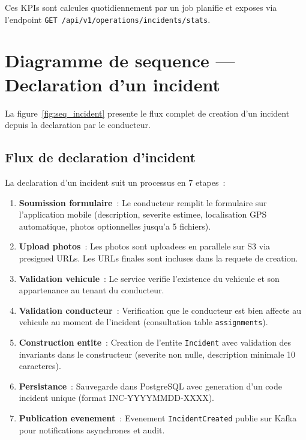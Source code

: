 \documentclass[12pt,a4paper]{report}
\begin{document}
Ces KPIs sont calcules quotidiennement par un job planifie et exposes
via l'endpoint \texttt{GET /api/v1/operations/incidents/stats}.

\section{Diagramme de sequence --- Declaration d'un incident}

La figure~\ref{fig:seq_incident} presente le flux complet de creation
d'un incident depuis la declaration par le conducteur.

\subsection{Flux de declaration d'incident}

La declaration d'un incident suit un processus en 7 etapes~:

\begin{enumerate}[leftmargin=2cm]
  \item \textbf{Soumission formulaire}~: Le conducteur remplit le formulaire
        sur l'application mobile (description, severite estimee, localisation
        GPS automatique, photos optionnelles jusqu'a 5 fichiers).
        
  \item \textbf{Upload photos}~: Les photos sont uploadees en parallele
        sur S3 via presigned URLs. Les URLs finales sont incluses dans
        la requete de creation.
        
  \item \textbf{Validation vehicule}~: Le service verifie l'existence
        du vehicule et son appartenance au tenant du conducteur.
        
  \item \textbf{Validation conducteur}~: Verification que le conducteur
        est bien affecte au vehicule au moment de l'incident (consultation
        table \texttt{assignments}).
        
  \item \textbf{Construction entite}~: Creation de l'entite \texttt{Incident}
        avec validation des invariants dans le constructeur (severite non
        nulle, description minimale 10 caracteres).
        
  \item \textbf{Persistance}~: Sauvegarde dans PostgreSQL avec generation
        d'un code incident unique (format INC-YYYYMMDD-XXXX).
        
  \item \textbf{Publication evenement}~: Evenement \texttt{IncidentCreated}
        publie sur Kafka pour notifications asynchrones et audit.
\end{enumerate}
\end{document}
